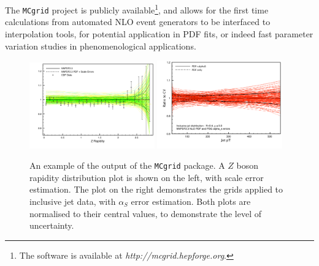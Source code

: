 The {\tt MCgrid} project is publicly available\footnote{The software is available at \emph{http://mcgrid.hepforge.org}.}, and allows for the first time calculations from automated NLO event generators to be interfaced to interpolation tools, for potential application in PDF fits, or indeed fast parameter variation studies in phenomenological applications.

\begin{figure}[h!]
\centering
\includegraphics[width=0.48\textwidth]{4-LHCtools/figs/100MDYReplicas_Scales.pdf}
\includegraphics[width=0.48\textwidth]{4-LHCtools/figs/JetsAlphas_0.pdf}
\caption[An example of the output of the {\tt MCgrid} package]{An example of the output of the {\tt MCgrid} package. A $Z$ boson rapidity distribution plot is shown on the left, with scale error estimation. The plot on the right demonstrates the grids applied to inclusive jet data, with $\alpha_S$ error estimation. Both plots are normalised to their central values, to demonstrate the level of uncertainty.}
\label{fig:MCgridreps}
\end{figure}